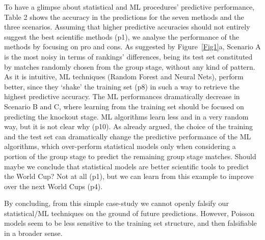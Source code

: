 \documentclass{statsoc}
\begin{document}
To have a glimpse about statistical and ML procedures' predictive performance, Table 2 shows the accuracy in the predictions for the seven methods and the three  scenarios. Assuming that 
higher predictive accuracies should not entirely suggest the best scientific methods (p1), we analyse the performance of the methods by focusing on pro and cons. As suggested by 
Figure~\ref{Fig1}a, Scenario A is the most noisy in terms of rankings' differences, being its test set constituted by matches randomly chosen from the group stage, without any kind 
of pattern. As it is intuitive, ML techniques (Random Forest and Neural Nets), perform better, since they `shake' the training set (p8) in such a way to retrieve the highest 
predictive accuracy. The ML performances dramatically decrease in Scenario B and C, where learning from the training set should be focused on predicting the knockout stage. ML algorithms learn less and in a very random way, but it is not clear why (p10).
As already argued, the choice of the training and the test set can dramatically 
change the predictive performance of the ML algorithms, which over-perform statistical models only when considering a portion of the group stage to predict the remaining 
group stage matches. Should maybe we conclude that statistical models are better scientific tools to predict the World Cup? Not at all (p1), but we can learn from this example to improve over the next World Cups (p4).

By concluding, from this simple case-study we cannot openly 
falsify our statistical/ML techniques on the ground of future predictions. However, Poisson models seem to be less sensitive to the training set structure, and then falsifiable in a broader sense.
\end{document}
